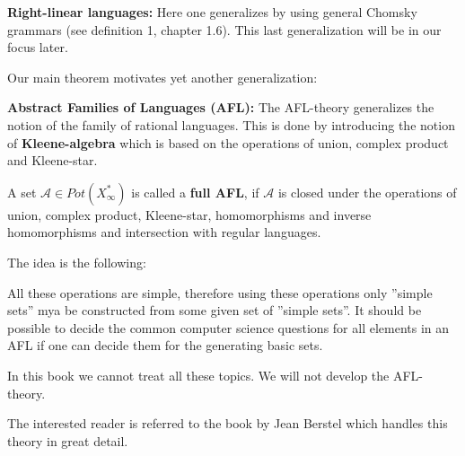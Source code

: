 {\bf Right-linear languages:} Here one generalizes by using general Chomsky
grammars (see definition 1, chapter 1.6). This last generalization will be in
our focus later.

Our main theorem motivates yet another generalization:

{\bf Abstract Families of Languages (AFL):} The AFL-theory generalizes the
notion of the family of rational languages. This is done by introducing the
notion of {\bf Kleene-algebra} which is based on the operations of union,
complex product and Kleene-star.

A set $\mathcal{A} \in Pot(X_\infty^*)$ is called a {\bf full AFL}, if
$\mathcal{A}$ is closed under the operations of union, complex product,
Kleene-star, homomorphisms and inverse homomorphisms and intersection with
regular languages.

The idea is the following:

All these operations are simple, therefore using these operations only ''simple
sets'' mya be constructed from some given set of ''simple sets''. It should be
possible to decide the common computer science questions for all elements in an
AFL if one can decide them for the generating basic sets.

In this book we cannot treat all these topics. We will not develop the
AFL-theory.

The interested reader is referred to the book by Jean Berstel \cite{Berstel79}
which handles this theory in great detail.

